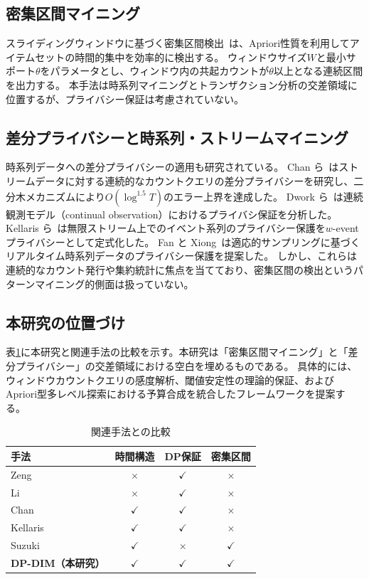 \subsection{密集区間マイニング}

スライディングウィンドウに基づく密集区間検出~\cite{suzuki2024dense}は、Apriori性質を利用してアイテムセットの時間的集中を効率的に検出する。
ウィンドウサイズ$W$と最小サポート$\theta$をパラメータとし、ウィンドウ内の共起カウントが$\theta$以上となる連続区間を出力する。
本手法は時系列マイニングとトランザクション分析の交差領域に位置するが、プライバシー保証は考慮されていない。

\subsection{差分プライバシーと時系列・ストリームマイニング}

時系列データへの差分プライバシーの適用も研究されている。
Chan ら~\cite{chan2011private}はストリームデータに対する連続的なカウントクエリの差分プライバシーを研究し、二分木メカニズムにより$O(\log^{1.5} T)$のエラー上界を達成した。
Dwork ら~\cite{dwork2010differential}は連続観測モデル（continual observation）におけるプライバシ保証を分析した。
Kellaris ら~\cite{kellaris2014differentially}は無限ストリーム上でのイベント系列のプライバシー保護を$w$-eventプライバシーとして定式化した。
Fan と Xiong~\cite{fan2014adaptive}は適応的サンプリングに基づくリアルタイム時系列データのプライバシー保護を提案した。
しかし、これらは連続的なカウント発行や集約統計に焦点を当てており、密集区間の検出というパターンマイニング的側面は扱っていない。

\subsection{本研究の位置づけ}

表\ref{tab:related-comparison}に本研究と関連手法の比較を示す。本研究は「密集区間マイニング」と「差分プライバシー」の交差領域における空白を埋めるものである。
具体的には、ウィンドウカウントクエリの感度解析、閾値安定性の理論的保証、およびApriori型多レベル探索における予算合成を統合したフレームワークを提案する。

\begin{table}[t]
\centering
\caption{関連手法との比較}
\label{tab:related-comparison}
\begin{tabular}{lccc}
\toprule
手法 & 時間構造 & DP保証 & 密集区間 \\
\midrule
Zeng~\cite{zeng2012differentially} & $\times$ & $\checkmark$ & $\times$ \\
Li~\cite{li2012privbasis} & $\times$ & $\checkmark$ & $\times$ \\
Chan~\cite{chan2011private} & $\checkmark$ & $\checkmark$ & $\times$ \\
Kellaris~\cite{kellaris2014differentially} & $\checkmark$ & $\checkmark$ & $\times$ \\
Suzuki~\cite{suzuki2024dense} & $\checkmark$ & $\times$ & $\checkmark$ \\
\textbf{DP-DIM（本研究）} & $\checkmark$ & $\checkmark$ & $\checkmark$ \\
\bottomrule
\end{tabular}
\end{table}

